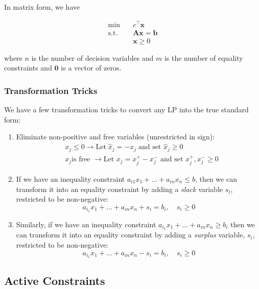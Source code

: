 \documentclass{article}
\begin{document}
\noindent In matrix form, we have 

\begin{align}\label{eq:2-standard form}
    \min \quad & c^{\top}\mathbf{x} \\ \nonumber 
    \text{s.t.} \quad & \mathbf{Ax} = \mathbf{b} \\ \nonumber 
    \quad & \mathbf{x} \geq 0 
\end{align}

\noindent where $n$ is the number of decision variables and $m$ is the number of equality constraints and $\mathbf{0}$ is a vector of zeros. 

\subsubsection{Transformation Tricks}
We have a few transformation tricks to convert any LP into the true standard form:

\begin{enumerate}
    \item Eliminate non-positive and free variables (unrestricted in sign): \begin{align*}
        & x_j \leq 0 \to \text{Let} \; \hat{x}_j = -x_j \; \text{and set } \hat{x}_j \geq 0 \\ 
        & x_j \text{is free } \to \text{Let } x_j = x_j^+ - x_j^- \text{ and set } x_j^+, x_j^- \geq 0  
    \end{align*}
    \item If we have an inequality constraint $a_{i1}x_{1}+ \dots + a_{in}x_n \leq b$, then we can transform it into an equality constraint by adding a \textit{slack} variable $s_i$, restricted to be non-negative: \begin{equation*}
        a_{i_{1}} x_{1} + \dots + a_{in}x_n + s_i = b_i, \quad s_i \geq 0
    \end{equation*}
    \item Similarly, if we have an inequality constraint $a_{i_{1}}x_{1} + \dots + a_{in} x_n \geq b_i$ then we can transform it into an equality constraint by adding a \textit{surplus} variable, $s_i$, restricted to be non-negative: \begin{equation*}
        a_{i_{1}}x_{1} + \dots + a_{in}x_n - s_i = b_i, \quad s_i \geq 0 
    \end{equation*}
\end{enumerate}

\subsection{Active Constraints}
\end{document}
